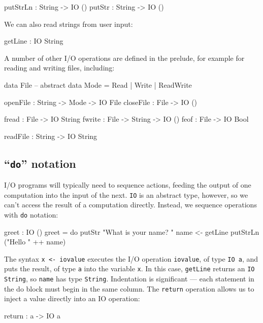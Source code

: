 \begin{code}
putStrLn : String -> IO ()
putStr   : String -> IO ()
\end{code}

We can also read strings from user input:

\begin{code}
getLine : IO String
\end{code}


\noindent
A number of other I/O operations are defined in the prelude, for example for reading and writing files, including:

\begin{code}
data File -- abstract
data Mode = Read | Write | ReadWrite

openFile  : String -> Mode -> IO File
closeFile : File -> IO ()

fread  : File -> IO String
fwrite : File -> String -> IO ()
feof   : File -> IO Bool

readFile : String -> IO String
\end{code}


\subsection{``\texttt{do}'' notation}
\label{sect:do}

I/O programs will typically need to sequence actions, feeding the output of one computation into the input of the next.
\texttt{IO} is an abstract type, however, so we can't access the result of a computation directly.
Instead, we sequence operations with \texttt{do} notation:

\begin{code}
greet : IO ()
greet = do putStr "What is your name? "
           name <- getLine
           putStrLn ("Hello " ++ name)
\end{code}


\noindent
The syntax \texttt{x <- iovalue} executes the I/O operation \texttt{iovalue}, of type \texttt{IO a}, and puts the result, of type \texttt{a} into the variable \texttt{x}.
In this case, \texttt{getLine} returns an \texttt{IO String}, so \texttt{name} has type \texttt{String}.
Indentation is significant --- each statement in the do block must begin in the same column.
The \texttt{return} operation allows us to inject a value directly into an IO operation:

\begin{code}
return : a -> IO a
\end{code}

